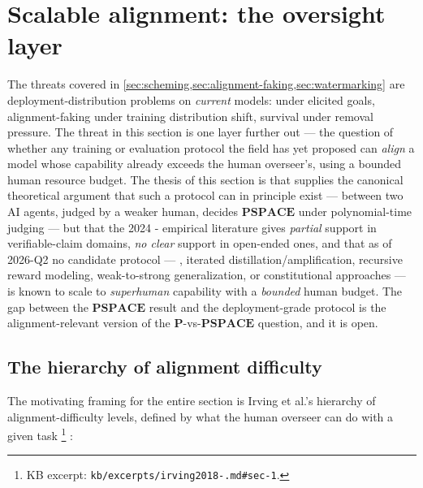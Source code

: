 
\section{Scalable alignment: the oversight layer}
\label{sec:scalable-oversight}

The threats covered in
\cref{sec:scheming,sec:alignment-faking,sec:watermarking} are
deployment-distribution problems on \emph{current} models: 
under elicited goals, alignment-faking under training distribution
shift,  survival under removal pressure. The threat in this
section is one layer further out --- the question of whether any
training or evaluation protocol the field has yet proposed can
\emph{align} a model whose capability already exceeds the human
overseer's, using a bounded human resource budget. The thesis of this
section is that \citet{irving2018-debate} supplies the canonical
theoretical argument that such a protocol can in principle exist ---
 between two AI agents, judged by a weaker human, decides
$\mathbf{PSPACE}$ under polynomial-time judging --- but that the 2024
- empirical literature gives \emph{partial} support in
verifiable-claim domains, \emph{no clear} support in open-ended ones,
and that as of 2026-Q2 no candidate protocol --- , iterated
distillation/amplification, recursive reward modeling, weak-to-strong
generalization, or constitutional approaches --- is known to scale to
\emph{superhuman} capability with a \emph{bounded} human budget. The
gap between the $\mathbf{PSPACE}$ result and the deployment-grade
protocol is the alignment-relevant version of the
$\mathbf{P}$-vs-$\mathbf{PSPACE}$ question, and it is open.

\subsection{The hierarchy of alignment difficulty}
\label{sec:oversight-hierarchy}

The motivating framing for the entire section is Irving et al.'s
hierarchy of alignment-difficulty levels, defined by what the human
overseer can do with a given task%
\footnote{KB excerpt: \texttt{kb/excerpts/irving2018-.md\#sec-1}.}
\citep[\S 1]{irving2018-debate}:

